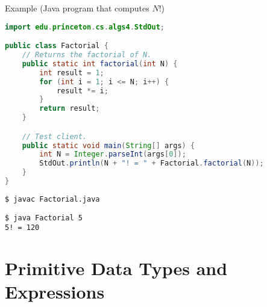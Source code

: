 \documentclass[8pt,a4paper,compress]{beamer}
\begin{document}
\begin{frame}[fragile]
\pause

Example (Java program that computes $N!$)

\begin{lstlisting}[language=Java]
import edu.princeton.cs.algs4.StdOut;

public class Factorial {
    // Returns the factorial of N.
    public static int factorial(int N) {
        int result = 1;
        for (int i = 1; i <= N; i++) {
            result *= i;
        }
        return result;
    }

    // Test client.
    public static void main(String[] args) {
        int N = Integer.parseInt(args[0]);
        StdOut.println(N + "! = " + Factorial.factorial(N));
    }
}
\end{lstlisting}

\pause

\begin{lstlisting}[language={}]
$ javac Factorial.java
\end{lstlisting}

\pause

\begin{lstlisting}[language={}]
$ java Factorial 5
5! = 120
\end{lstlisting}
\end{frame}

\section{Primitive Data Types and Expressions}
\end{document}
